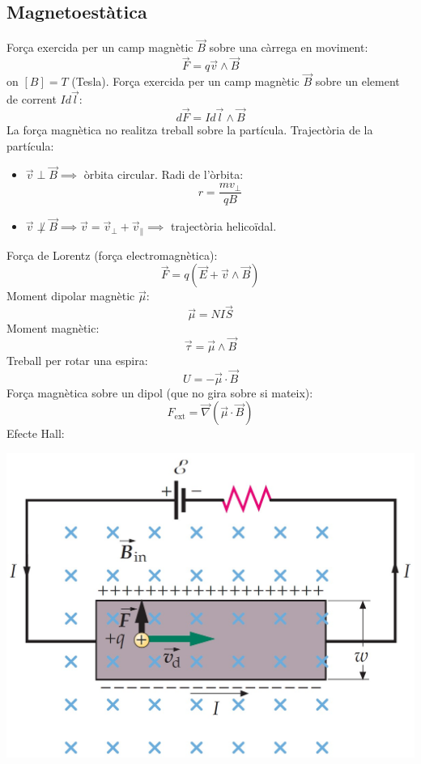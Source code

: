 \documentclass[class=article,10pt,crop=false]{standalone}
\begin{document}
\begin{multicols}{2}
\subsection{Magnetoestàtica}
Força exercida per un camp magnètic $\Vec{B}$ sobre una càrrega en moviment: $$\Vec{F}=q\Vec{v}\wedge\Vec{B}$$ {on $[B]=T$ (Tesla).}\newline
Força exercida per un camp magnètic $\Vec{B}$ sobre un element de corrent $Id\Vec{l}$: $$d\Vec{F}=Id\Vec{l}\wedge\Vec{B}$$
La força magnètica no realitza treball sobre la partícula.\newline
Trajectòria de la partícula:
\begin{itemize}
    \item $\Vec{v}\perp\Vec{B}\implies$ òrbita circular. Radi de l'òrbita:$$r=\frac{mv_\perp}{qB}$$
    \item $\Vec{v}\not\perp\Vec{B}\implies\Vec{v}=\Vec{v}_\perp+\Vec{v}_\parallel\implies$ trajectòria helicoïdal.
\end{itemize}
Força de Lorentz (força electromagnètica): $$\Vec{F}=q(\Vec{E}+\Vec{v}\wedge\Vec{B})$$
Moment dipolar magnètic $\Vec{\mu}$: $$\Vec{\mu}=NI\Vec{S}$$
Moment magnètic: $$\Vec{\tau}=\Vec{\mu}\wedge\Vec{B}$$ 
Treball per rotar una espira: $$U=-\Vec{\mu}\cdot\Vec{B}$$
Força magnètica sobre un dipol (que no gira sobre si mateix): $$F_{\text{ext}}=\Vec{\nabla}(\Vec{\mu}\cdot\Vec{B})$$
Efecte Hall:\newline
\begin{minipage}{\linewidth}
    \centering
    \includegraphics[width=\linewidth]{Physics/1st/Electricity_and_magnetism/Images/hall+.jpg}

\end{minipage}
\end{multicols}
\end{document}
